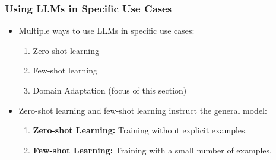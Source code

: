 \begin{frame}[fragile]\frametitle{Using LLMs in Specific Use Cases}
  \begin{itemize}
    \item Multiple ways to use LLMs in specific use cases:
      \begin{enumerate}
        \item Zero-shot learning
        \item Few-shot learning
        \item Domain Adaptation (focus of this section)
      \end{enumerate}
    \item Zero-shot learning and few-shot learning instruct the general model:
      \begin{enumerate}
        \item \textbf{Zero-shot Learning:} Training without explicit examples.
        \item \textbf{Few-shot Learning:} Training with a small number of examples.
      \end{enumerate}
  \end{itemize}
\end{frame}

